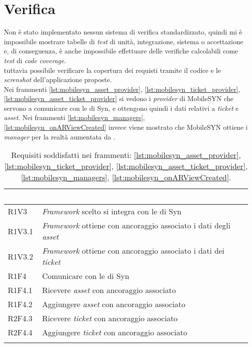 \section{Verifica}
Non è stato implementato nessun sistema di verifica standardizzato, quindi mi è impossibile mostrare tabelle di \textit{test} di unità, integrazione, sistema o accettazione e, di conseguenza, è anche impossibile effettuare delle verifiche calcolabili come \textit{test} di \textit{code coverage}.\\
\e tuttavia possibile verificare la copertura dei requisti tramite il codice e le \textit{screnshot} dell'applicazione proposte.\\
Nei frammenti \ref{lst:mobilesyn_asset_provider}, \ref{lst:mobilesyn_ticket_provider}, \ref{lst:mobilesyn_asset_ticket_provider} si vedono i \textit{provider} di MobileSYN che servono a comunicare con le \api{} di Syn, e ottengono quindi i dati relativi a \textit{ticket} e \textit{asset}.
Nei frammenti \ref{lst:mobilesyn_managers}, \ref{lst:mobilesyn_onARViewCreated} invece viene mostrato che MobileSYN ottiene i \textit{manager} per la realtà aumentata da \aplug{}.

{
    \setlength{\freewidth}{\dimexpr\textwidth-10\tabcolsep}
    \renewcommand{\arraystretch}{1.5}
    \centering
    \setlength{\aboverulesep}{0pt}
    \setlength{\belowrulesep}{0pt}
    \begin{longtable}{C{.15\freewidth} C{.965\freewidth}}
       \toprule
    \textcolor{white}{\textbf{Codice}}&
    \textcolor{white}{\textbf{Descrizione}}\\
    \toprule
    \endhead

    R1V3 & \textit{Framework} scelto si integra con le \api{} di Syn\\
    R1V3.1 & \textit{Framework} ottiene con ancoraggio associato i dati degli \textit{asset}\\
    R1V3.2 & \textit{Framework} ottiene con ancoraggio associato i dati dei \textit{ticket}\\ 
    R1F4 & Comunicare con le \api{} di Syn\\
    R1F4.1 & Ricevere \textit{asset} con ancoraggio associato\\
    R1F4.2 & Aggiungere \textit{asset} con ancoraggio associato\\
    R2F4.3 & Ricevere \textit{ticket} con ancoraggio associato\\
    R2F4.4 & Aggiungere \textit{ticket} con ancoraggio associato\\
  
    \bottomrule
    \caption{Requisiti soddisfatti nei frammenti: \ref{lst:mobilesyn_asset_provider}, \ref{lst:mobilesyn_ticket_provider}, \ref{lst:mobilesyn_asset_ticket_provider}, \ref{lst:mobilesyn_managers}, \ref{lst:mobilesyn_onARViewCreated}.}
    \end{longtable}
}

